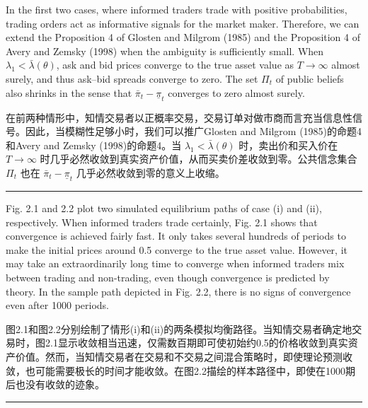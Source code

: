 \documentclass[12pt,a4paper]{article}
\newenvironment{original}{%
  \par\vspace{4pt}\noindent%
  \color{black}%
  \ignorespaces
}{%
  \par\vspace{2pt}%
}
\newenvironment{translation}{%
  \par\vspace{2pt}\noindent%
  \color{transblue}%
  \ignorespaces
}{%
  \par\vspace{4pt}\hrule\vspace{6pt}%
}
\begin{document}
\begin{original}
In the first two cases, where informed traders trade with positive probabilities, trading orders act as informative signals for the market maker. Therefore, we can extend the Proposition 4 of Glosten and Milgrom (1985) and the Proposition 4 of Avery and Zemsky (1998) when the ambiguity is sufficiently small. When $\lambda_1 < \bar{\lambda}(\theta)$, ask and bid prices converge to the true asset value as $T \to \infty$ almost surely, and thus ask--bid spreads converge to zero. The set $\Pi_t$ of public beliefs also shrinks in the sense that $\bar{\pi}_t - \underline{\pi}_t$ converges to zero almost surely.
\end{original}
\begin{translation}
在前两种情形中，知情交易者以正概率交易，交易订单对做市商而言充当信息性信号。因此，当模糊性足够小时，我们可以推广Glosten and Milgrom (1985)的命题4和Avery and Zemsky (1998)的命题4。当 $\lambda_1 < \bar{\lambda}(\theta)$ 时，卖出价和买入价在 $T \to \infty$ 时几乎必然收敛到真实资产价值，从而买卖价差收敛到零。公共信念集合 $\Pi_t$ 也在 $\bar{\pi}_t - \underline{\pi}_t$ 几乎必然收敛到零的意义上收缩。
\end{translation}

\begin{original}
Fig. 2.1 and 2.2 plot two simulated equilibrium paths of case (i) and (ii), respectively. When informed traders trade certainly, Fig. 2.1 shows that convergence is achieved fairly fast. It only takes several hundreds of periods to make the initial prices around 0.5 converge to the true asset value. However, it may take an extraordinarily long time to converge when informed traders mix between trading and non-trading, even though convergence is predicted by theory. In the sample path depicted in Fig. 2.2, there is no signs of convergence even after 1000 periods.
\end{original}
\begin{translation}
图2.1和图2.2分别绘制了情形(i)和(ii)的两条模拟均衡路径。当知情交易者确定地交易时，图2.1显示收敛相当迅速，仅需数百期即可使初始约0.5的价格收敛到真实资产价值。然而，当知情交易者在交易和不交易之间混合策略时，即使理论预测收敛，也可能需要极长的时间才能收敛。在图2.2描绘的样本路径中，即使在1000期后也没有收敛的迹象。
\end{translation}
\end{document}

